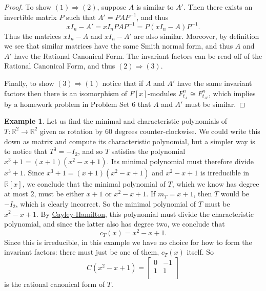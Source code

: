 \documentclass[12pt]{report}
\numberwithin{equation}{section}
\numberwithin{theorem}{chapter}
\theoremstyle{definition}
\newtheorem{example}[theorem]{Example}
\newtheorem*{basic properties}{Basic Properties}
\newtheorem*{Important Remark}{Important Remark}
\begin{document}
\begin{proof}
To show $(1)\Rightarrow (2)$, suppose $A$ is similar to $A'$. Then there exists an invertible matrix $P$ such that $A' = PAP^{-1}$, and thus 
$$xI_n-A' = xI_n PAP^{-1} = P(xI_n - A) P^{-1}.$$
Thus the matrices $xI_n-A$ and $xI_n-A'$ are also similar. Moreover, by definition we see that similar matrices have the same Smith normal form, and thus $A$ and $A'$ have the Rational Canonical Form. The invariant factors can be read off of the Rational Canonical Form, and thus $(2)\Rightarrow (3)$.

Finally, to show $(3)\Rightarrow (1)$ notice that if $A$ and $A'$ have the same invariant factors then there is an isomorphism of $F[x]$-modules $F^n_{t_A} \cong F^n_{t_{A'}}$, which implies by a homework problem in Problem Set 6 that $A$ and $A'$ must be similar.
\end{proof}













\begin{example}\label{example rotation 60}
Let us find the minimal and characteristic polynomials of $T: \mathbb{R}^2 \to \mathbb{R}^2$ given as rotation by 60 degrees counter-clockwise. We could write this down as matrix and compute its characteristic polynomial, but a simpler way is to notice that $T^3 = -I_2$, and so $T$ satisfies the polynomial $x^3 + 1 = (x+1)(x^2 - x + 1)$. Its minimal polynomial must therefore divide $x^3 +1$. Since $x^3 +1 = (x+1)(x^2 - x +1)$ and $x^2 - x +1$ is irreducible in $\mathbb{R}[x]$, we conclude that the minimal polynomial of $T$, which we know has degree at most $2$, must be either $x+1$ or $x^2 - x +1$. If $m_T = x+1$, then $T$ would be $-I_2$, which is clearly incorrect. So the minimal polynomial of $T$ must be $x^2 - x +1$. By \hyperref[cayley-hamilton]{Cayley-Hamilton}, this polynomial must divide the characteristic polynomial, and since the latter also has degree two, we conclude that
$$c_T(x) = x^2 - x + 1.$$
Since this is irreducible, in this example we have no choice for how to form the invariant factors: there must just be one of them, $c_T(x)$ itself. So
$$C(x^2 - x + 1) = 
\begin{bmatrix}
0 & -1 \\
1 & 1 \\
\end{bmatrix}$$
is the rational canonical form of $T$. 
\end{example}
\end{document}
